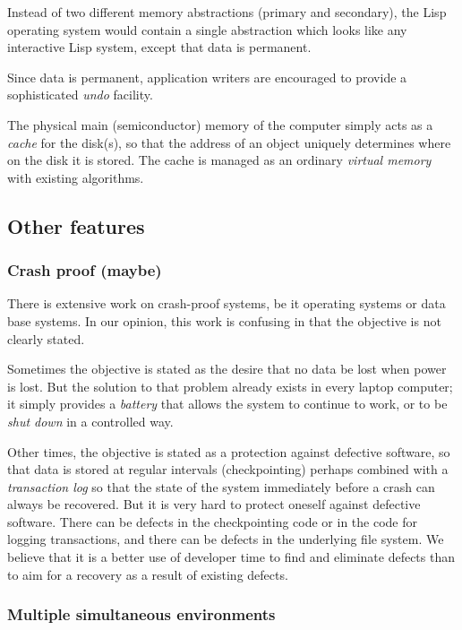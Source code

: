 Instead of two different memory abstractions (primary and
secondary), the Lisp operating system would contain a single
abstraction which looks like any interactive Lisp system, except
that data is permanent.

Since data is permanent, application writers are encouraged to
provide a sophisticated \emph{undo} facility.  

The physical main (semiconductor) memory of the computer simply acts
as a \emph{cache} for the disk(s), so that the address of an object
uniquely determines where on the disk it is stored.  The cache is
managed as an ordinary \emph{virtual memory} with existing
algorithms. 

\subsection{Other features}

\subsubsection{Crash proof (maybe)}

There is extensive work on crash-proof systems, be it operating
systems or data base systems.  In our opinion, this work is
confusing in that the objective is not clearly stated.

Sometimes the objective is stated as the desire that no data be lost
when power is lost.  But the solution to that problem already exists
in every laptop computer; it simply provides a \emph{battery} that
allows the system to continue to work, or to be \emph{shut down} in a
controlled way. 

Other times, the objective is stated as a protection against
defective software, so that data is stored at regular intervals
(checkpointing) perhaps combined with a \emph{transaction log} so
that the state of the system immediately before a crash can always
be recovered.  But it is very hard to protect oneself against
defective software.  There can be defects in the checkpointing code
or in the code for logging transactions, and there can be defects in
the underlying file system.  We believe that it is a better use of
developer time to find and eliminate defects than to aim for a
recovery as a result of existing defects.

\subsubsection{Multiple simultaneous environments}


